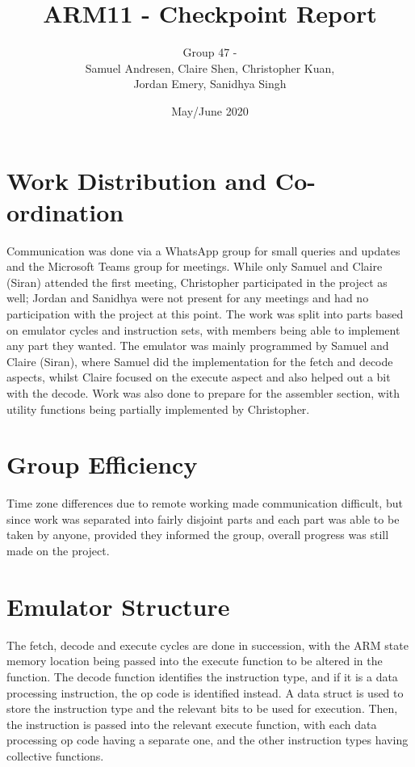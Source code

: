 \documentclass{article}
\title{ARM11 - Checkpoint Report}
\author{Group 47 - \\
Samuel Andresen, Claire Shen, Christopher Kuan, \\
Jordan Emery, Sanidhya Singh}
\date{May/June 2020}
\begin{document}
\maketitle

\section*{Work Distribution and Co-ordination}
Communication was done via a WhatsApp group for small queries and updates and 
the Microsoft Teams group for meetings. While only Samuel and Claire (Siran) 
attended the first meeting, Christopher participated in the project as well; 
Jordan and Sanidhya were not present for any meetings and had no participation 
with the project at this point. The work was split into parts based on emulator 
cycles and instruction sets, with members being able to implement any part they 
wanted. The emulator was mainly programmed by Samuel and Claire (Siran), where 
Samuel did the implementation for the fetch and decode aspects, whilst Claire 
focused on the execute aspect and also helped out a bit with the decode. Work 
was also done to prepare for the assembler section, with utility functions being 
partially implemented by Christopher.

\section*{Group Efficiency}
Time zone differences due to remote working made communication difficult, but 
since work was separated into fairly disjoint parts and each part was able to be 
taken by anyone, provided they informed the group, overall progress was still 
made on the project.

\section*{Emulator Structure}
The fetch, decode and execute cycles are done in succession, with the ARM state 
memory location being passed into the execute function to be altered in the 
function. The decode function identifies the instruction type, and if it is a 
data processing instruction, the op code is identified instead. A data struct 
is used to store the instruction type and the relevant bits to be used for 
execution. Then, the instruction is passed into the relevant execute function, 
with each data processing op code having a separate one, and the other 
instruction types having collective functions. 
\end{document}
